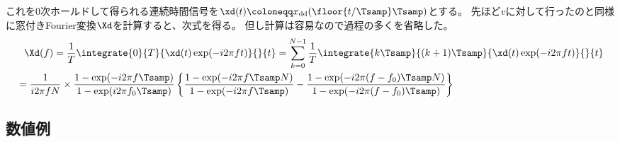             これを0次ホールドして得られる連続時間信号を$\xd(t) \coloneqq \xdd(\floor{t/\Tsamp}\Tsamp)$とする。
            先ほど$v$に対して行ったのと同様に窓付きFourier変換$\Xd$を計算すると、次式を得る。
            但し計算は容易なので過程の多くを省略した。
            \begin{align*}
                &\phantom{=} \Xd(f) = \frac{1}{T} \integrate{0}{T}{\xd(t)\exp(-i 2\pi f t)}{}{t} = \sum_{k=0}^{N-1} \frac{1}{T} \integrate{k\Tsamp}{(k+1)\Tsamp}{\xd(t)\exp(-i 2\pi f t)}{}{t} \\
                &= \frac{1}{i 2\pi f N}\times\frac{1-\exp(-i 2\pi f\Tsamp)}{1-\exp(i 2\pi f_0\Tsamp)} \left\{\frac{1-\exp(-i 2\pi f \Tsamp N)}{1-\exp(-i 2\pi f \Tsamp)} - \frac{1-\exp(-i 2\pi (f-f_0) \Tsamp N)}{1-\exp(-i 2\pi (f-f_0) \Tsamp)}\right\}
            \end{align*}
        \subsection{数値例}
